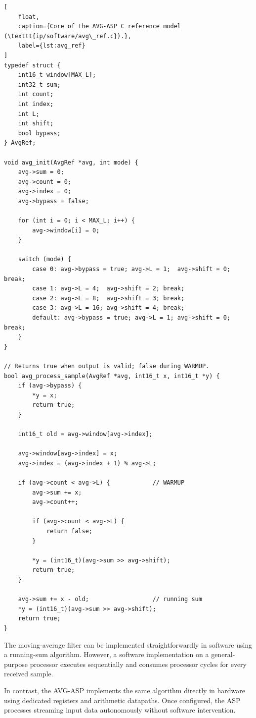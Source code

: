 \documentclass[10pt, a4paper]{article}
\begin{document}
\begin{lstlisting}[
    float,
    caption={Core of the AVG-ASP C reference model (\texttt{ip/software/avg\_ref.c}).},
    label={lst:avg_ref}
]
typedef struct {
    int16_t window[MAX_L];
    int32_t sum;
    int count;
    int index;
    int L;
    int shift;
    bool bypass;
} AvgRef;

void avg_init(AvgRef *avg, int mode) {
    avg->sum = 0;
    avg->count = 0;
    avg->index = 0;
    avg->bypass = false;

    for (int i = 0; i < MAX_L; i++) {
        avg->window[i] = 0;
    }

    switch (mode) {
        case 0: avg->bypass = true; avg->L = 1;  avg->shift = 0; break;
        case 1: avg->L = 4;  avg->shift = 2; break;
        case 2: avg->L = 8;  avg->shift = 3; break;
        case 3: avg->L = 16; avg->shift = 4; break;
        default: avg->bypass = true; avg->L = 1; avg->shift = 0; break;
    }
}

// Returns true when output is valid; false during WARMUP.
bool avg_process_sample(AvgRef *avg, int16_t x, int16_t *y) {
    if (avg->bypass) {
        *y = x;
        return true;
    }

    int16_t old = avg->window[avg->index];

    avg->window[avg->index] = x;
    avg->index = (avg->index + 1) % avg->L;

    if (avg->count < avg->L) {            // WARMUP
        avg->sum += x;
        avg->count++;
        
        if (avg->count < avg->L) {
            return false;
        }
        
        *y = (int16_t)(avg->sum >> avg->shift);
        return true;
    }

    avg->sum += x - old;                  // running sum
    *y = (int16_t)(avg->sum >> avg->shift);
    return true;
}
\end{lstlisting}

The moving-average filter can be implemented straightforwardly in software using a running-sum algorithm. However, a software implementation on a general-purpose processor executes sequentially and consumes processor cycles for every received sample.

In contrast, the AVG-ASP implements the same algorithm directly in hardware using dedicated registers and arithmetic datapaths. Once configured, the ASP processes streaming input data autonomously without software intervention.
\end{document}
